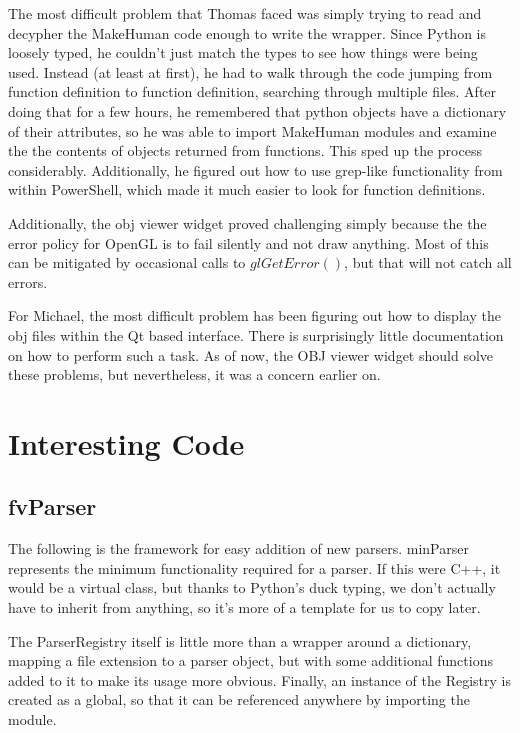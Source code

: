 \documentclass[letterpaper,10pt, onecolumn]{IEEEtran}
\begin{document}
The most difficult problem that Thomas faced was simply trying to read and decypher the MakeHuman code enough to write the wrapper. Since Python is loosely typed, he couldn't just match the types to see how things were being used. Instead (at least at first), he had to walk through the code jumping from function definition to function definition, searching through multiple files. After doing that for a few hours, he remembered that python objects have a dictionary of their attributes, so he was able to import MakeHuman modules and examine the the contents of objects returned from functions. This sped up the process considerably. Additionally, he figured out how to use grep-like functionality from within PowerShell, which made it much easier to look for function definitions.

Additionally, the obj viewer widget proved challenging simply because the the error policy for OpenGL is to fail silently and not draw anything. Most of this can be mitigated by occasional calls to $glGetError()$, but that will not catch all errors.

For Michael, the most difficult problem has been figuring out how to display the obj files within the Qt based interface. There is surprisingly little documentation on how to perform such a task. As of now, the OBJ viewer widget should solve these problems, but nevertheless, it was a concern earlier on.

\section*{Interesting Code} \label{interestingCode}

\subsection*{fvParser} 

The following is the framework for easy addition of new parsers. minParser represents the minimum functionality required for a parser. If this were C++, it would be a virtual class, but thanks to Python's duck typing, we don't actually have to inherit from anything, so it's more of a template for us to copy later.

The ParserRegistry itself is little more than a wrapper around a dictionary, mapping a file extension to a parser object, but with some additional functions added to it to make its usage more obvious. Finally, an instance of the Registry is created as a global, so that it can be referenced anywhere by importing the module.
\end{document}
